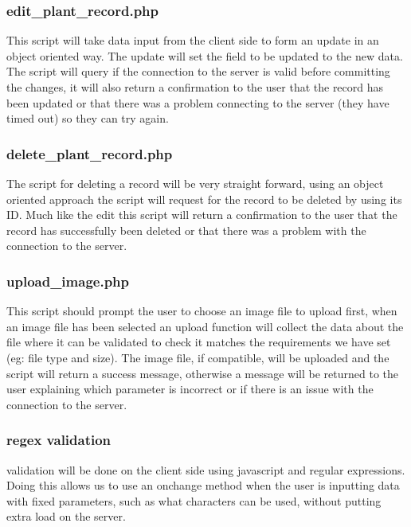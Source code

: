 	\subsubsection{edit\_plant\_record.php}
		This script will take data input from the client side to form an update in an object oriented way. The update will set the field to be updated to the new data. The script will query if the connection to the server is valid before committing the changes, it will also return a confirmation to the user that the record has been updated or that there was a problem connecting to the server (they have timed out) so they can try again.

	\subsubsection{delete\_plant\_record.php}
		The script for deleting a record will be very straight forward, using an object oriented approach the script will request for the record to be deleted by using its ID. Much like the edit this script will return a confirmation to the user that the record has successfully been deleted or that there was a problem with the connection to the server.

	\subsubsection{upload\_image.php}
		This script should prompt the user to choose an image file to upload first, when an image file has been selected an upload function will collect the data about the file where it can be validated to check it matches the requirements we have set (eg: file type and size). The image file, if compatible, will be uploaded and the script will return a success message, otherwise a message will be returned to the user explaining which parameter is incorrect or if there is an issue with the connection to the server.

	\subsubsection{regex validation}
		validation will be done on the client side using javascript and regular expressions. Doing this allows us to use an onchange method when the user is inputting data with fixed parameters, such as what characters can be used, without putting extra load on the server.

